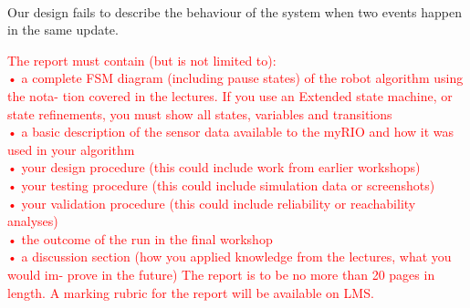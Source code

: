 \documentclass[11pt]{article}
\begin{document}
\paragraph{}
Our design fails to describe the behaviour of the system when two events happen in the same update. 

\textcolor{red}{The report must contain (but is not limited to):\\
• a complete FSM diagram (including pause states) of the robot algorithm using the nota- tion covered in the lectures. If you use an Extended state machine, or state refinements, you must show all states, variables and transitions\\
• a basic description of the sensor data available to the myRIO and how it was used in your algorithm\\
• your design procedure (this could include work from earlier workshops)\\
• your testing procedure (this could include simulation data or screenshots)\\
• your validation procedure (this could include reliability or reachability analyses)\\
• the outcome of the run in the final workshop\\
• a discussion section (how you applied knowledge from the lectures, what you would im- prove in the future)
The report is to be no more than 20 pages in length. A marking rubric for the report will be available on LMS.
}



\medskip



\end{document}
